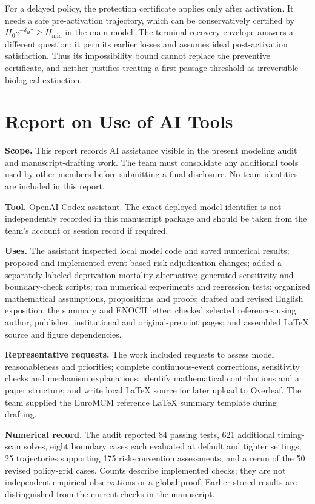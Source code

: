 \documentclass[12pt,a4paper]{article}
\theoremstyle{remark}
\newcommand{\Hmin}{H_{\min}}
\begin{document}
For a delayed policy, the protection certificate applies only after activation. It needs a safe pre-activation trajectory, which can be conservatively certified by $H_0e^{-\delta_H\tau}\ge\Hmin$ in the main model. The terminal recovery envelope answers a different question: it permits earlier losses and assumes ideal post-activation satisfaction. Thus its impossibility bound cannot replace the preventive certificate, and neither justifies treating a first-passage threshold as irreversible biological extinction.

\clearpage
\section*{Report on Use of AI Tools}
\textbf{Scope.} This report records AI assistance visible in the present modeling audit and manuscript-drafting work. The team must consolidate any additional tools used by other members before submitting a final disclosure. No team identities are included in this report.

\textbf{Tool.} OpenAI Codex assistant. The exact deployed model identifier is not independently recorded in this manuscript package and should be taken from the team's account or session record if required.

\textbf{Uses.} The assistant inspected local model code and saved numerical results; proposed and implemented event-based risk-adjudication changes; added a separately labeled deprivation-mortality alternative; generated sensitivity and boundary-check scripts; ran numerical experiments and regression tests; organized mathematical assumptions, propositions and proofs; drafted and revised English exposition, the summary and ENOCH letter; checked selected references using author, publisher, institutional and original-preprint pages; and assembled LaTeX source and figure dependencies.

\textbf{Representative requests.} The work included requests to assess model reasonableness and priorities; complete continuous-event corrections, sensitivity checks and mechanism explanations; identify mathematical contributions and a paper structure; and write local LaTeX source for later upload to Overleaf. The team supplied the EuroMCM reference LaTeX summary template during drafting.

\textbf{Numerical record.} The audit reported 84 passing tests, 621 additional timing-scan solves, eight boundary cases each evaluated at default and tighter settings, 25 trajectories supporting 175 risk-convention assessments, and a rerun of the 50 revised policy-grid cases. Counts describe implemented checks; they are not independent empirical observations or a global proof. Earlier stored results are distinguished from the current checks in the manuscript.
\end{document}
